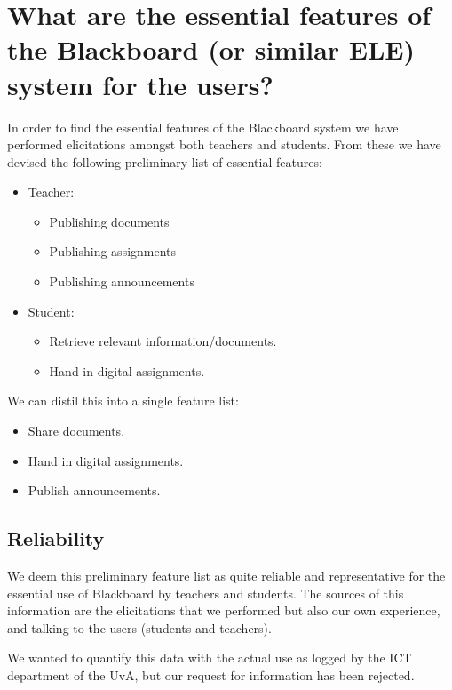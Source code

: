 \section{What are the essential features of the Blackboard (or similar ELE) system for the users?}
In order to find the essential features of the Blackboard system we have performed elicitations amongst both teachers and students. From these we have devised the following preliminary list of essential features:

\begin{itemize}
	\item Teacher:
	\begin{itemize}
		\item Publishing documents
		\item Publishing assignments
		\item Publishing announcements
	\end{itemize}

	\item Student:
	\begin{itemize}
		\item Retrieve relevant information/documents.
		\item Hand in digital assignments.
	\end{itemize}
\end{itemize}

We can distil this into a single feature list:
\begin{itemize}
	\item Share documents.
	\item Hand in digital assignments.
	\item Publish announcements.
\end{itemize}

\subsection{Reliability}
We deem this preliminary feature list as quite reliable and representative for the essential use of Blackboard by teachers and students. The sources of this information are the elicitations that we performed but also our own experience, and talking to the users (students and teachers).

We wanted to quantify this data with the actual use as logged by the ICT department of the UvA, but our request for information has been rejected.
                                                                                                                                               

